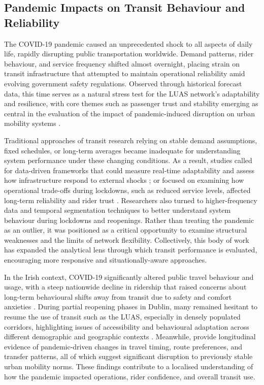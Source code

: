\subsection*{Pandemic Impacts on Transit Behaviour and Reliability}

    The COVID-19 pandemic caused an unprecedented shock to all aspects of daily life, rapidly disrupting public transportation worldwide. Demand patterns, rider behaviour, and service frequency shifted almost overnight, placing strain on transit infrastructure that attempted to maintain operational reliability amid evolving government safety regulations. Observed through historical forecast data, this time serves as a natural stress test for the LUAS network’s adaptability and resilience, with core themes such as passenger trust and stability emerging as central in the evaluation of the impact of pandemic-induced disruption on urban mobility systems \parencite{benita2021human}.

    Traditional approaches of transit research relying on stable demand assumptions, fixed schedules, or long-term averages became inadequate for understanding system performance under these changing conditions. As a result, studies called for data-driven frameworks that could measure real-time adaptability and assess how infrastructure respond to external shocks \parencite{gutierrez2021covid}; or focused on examining how operational trade-offs during lockdowns, such as reduced service levels, affected long-term reliability and rider trust \parencite{deborger2021covid}. Researchers also turned to higher-frequency data and temporal segmentation techniques to better understand system behaviour during lockdowns and reopenings. Rather than treating the pandemic as an outlier, it was positioned as a critical opportunity to examine structural weaknesses and the limits of network flexibility. Collectively, this body of work has expanded the analytical lens through which transit performance is evaluated, encouraging more responsive and situationally-aware approaches.

    In the Irish context, COVID-19 significantly altered public travel behaviour and usage, with a steep nationwide decline in ridership that raised concerns about long-term behavioural shifts away from transit due to safety and comfort anxieties \parencite{hynes2020utility}. During partial reopening phases in Dublin, many remained hesitant to resume the use of transit such as the LUAS, especially in densely populated corridors, highlighting issues of accessibility and behavioural adaptation across different demographic and geographic contexts \parencite{caulfield2021trinity}. Meanwhile, \textcite{marra2022impact} provide longitudinal evidence of pandemic-driven changes in travel timing, route preferences, and transfer patterns, all of which suggest significant disruption to previously stable urban mobility norms. These findings contribute to a localised understanding of how the pandemic impacted operations, rider confidence, and overall transit use.

